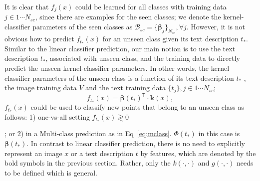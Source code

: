 It is clear that $f_j({x})$ could be learned for  all classes with training data $j \in  {1} \cdots {N_{sc}}$, since there are examples for the seen classes; we denote the kernel-classifier parameters of the seen classes as $\mathcal{B}_{sc} =  \{  \boldsymbol{\beta}_j \}_{N_{sc}}, \forall j$. However, it is not obvious how to predict $f_{{t}_*}({x})$ for an unseen class given its text description ${t}_*$. Similar to the linear classifier prediction, our main notion is to use the text description ${t}_{*}$, associated with unseen class, and the training data to directly predict the unseen kernel-classifier parameters. In other words, the kernel classifier parameters of the unseen class is a function of  its text description ${t}_*$ , the image training data $V$ and the text training data $\{t_j\}, j\in 1 \cdots N_{sc}$; \ie \small
\[   f_{{t}_*}({x}) = \boldsymbol{\beta}({t}_*)^\textsf{T} \cdot \textbf{k}({x}), \] \normalsize
 $ f_{{t}_*}({x})$ could be used to classify new points that	 belong to an  unseen class as follows: 1) one-vs-all setting  $f_{{t}_*}({x})  \gtrless  0$  ; or 2) in a Multi-class prediction as in Eq~\ref{eq:mclass}. ${\Phi}(t_*)$ in this case is $\boldsymbol{\beta}({t}_{*})$. In contrast to linear classifier prediction, there is no need to explicitly represent an image $x$ or a text description $t$ by features, which are denoted by the bold symbols in the previous section. Rather, only the  $k(\cdot,\cdot)$  and $g(\cdot,\cdot)$ needs to be defined which is general. 
